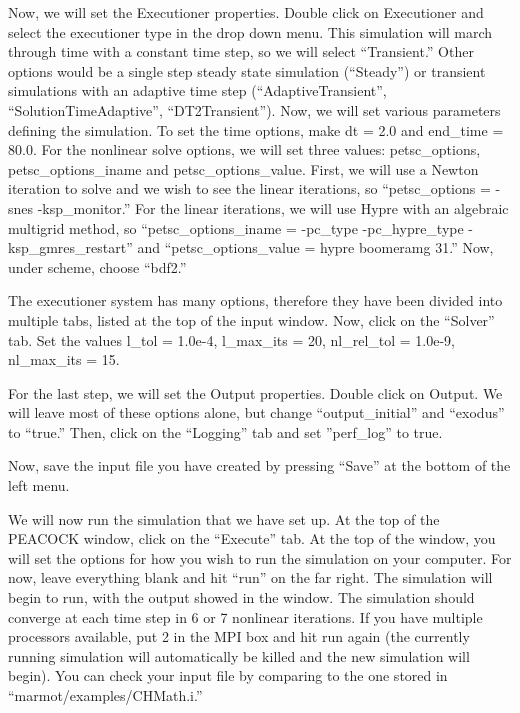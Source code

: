 \documentclass[letter,12pt,fleqn]{article}
\begin{document}
Now, we will set the Executioner properties. Double click on Executioner and select the executioner type in the drop down menu. This simulation will march through time with a constant time step, so we will select ``Transient.'' Other options would be a single step steady state simulation (``Steady'') or transient simulations with an adaptive time step (``AdaptiveTransient'', ``SolutionTimeAdaptive'', ``DT2Transient''). Now, we will set various parameters defining the simulation. To set the time options, make dt = 2.0 and end\_time = 80.0. For the nonlinear solve options, we will set three values: petsc\_options, petsc\_options\_iname and petsc\_options\_value. First, we will use a Newton iteration to solve and we wish to see the linear iterations, so ``petsc\_options = -snes -ksp\_monitor.'' For the linear iterations, we will use Hypre with an algebraic multigrid method, so ``petsc\_options\_iname = -pc\_type -pc\_hypre\_type -ksp\_gmres\_restart'' and ``petsc\_options\_value = hypre boomeramg 31.'' Now, under scheme, choose ``bdf2.''

The executioner system has many options, therefore they have been divided into multiple tabs, listed at the top of the input window. Now, click on the ``Solver'' tab. Set the values l\_tol = 1.0e-4, l\_max\_its = 20, nl\_rel\_tol = 1.0e-9, nl\_max\_its = 15.

For the last step, we will set the Output properties. Double click on Output. We will leave most of these options alone, but change ``output\_initial'' and ``exodus'' to ``true.'' Then, click on the ``Logging'' tab and set ''perf\_log'' to true.

Now, save the input file you have created by pressing ``Save'' at the bottom of the left menu.

We will now run the simulation that we have set up. At the top of the PEACOCK window, click on the ``Execute'' tab. At the top of the window, you will set the options for how you wish to run the simulation on your computer. For now, leave everything blank and hit ``run'' on the far right. The simulation will begin to run, with the output showed in the window. The simulation should converge at each time step in 6 or 7 nonlinear iterations. If you have multiple processors available, put 2 in the MPI box and hit run again (the currently running simulation will automatically be killed and the new simulation will begin). You can check your input file by comparing to the one stored in ``marmot/examples/CHMath.i.''
\end{document}
